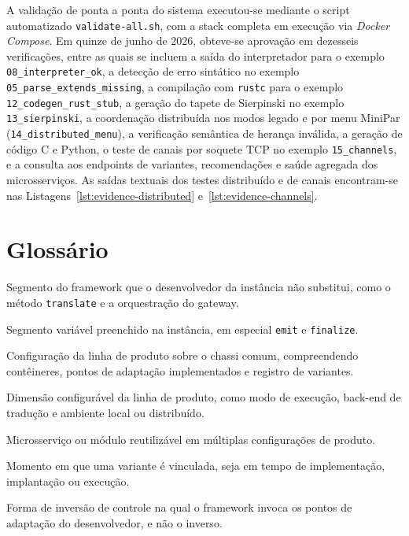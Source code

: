 A validação de ponta a ponta do sistema executou-se mediante o script automatizado \texttt{validate-all.sh}, com a stack completa em execução via \emph{Docker Compose}. Em quinze de junho de 2026, obteve-se aprovação em dezesseis verificações, entre as quais se incluem a saída do interpretador para o exemplo \texttt{08\_interpreter\_ok}, a detecção de erro sintático no exemplo \texttt{05\_parse\_extends\_missing}, a compilação com \texttt{rustc} para o exemplo \texttt{12\_codegen\_rust\_stub}, a geração do tapete de Sierpinski no exemplo \texttt{13\_sierpinski}, a coordenação distribuída nos modos legado e por menu MiniPar (\texttt{14\_distributed\_menu}), a verificação semântica de herança inválida, a geração de código C e Python, o teste de canais por soquete TCP no exemplo \texttt{15\_channels}, e a consulta aos endpoints de variantes, recomendações e saúde agregada dos microsserviços. As saídas textuais dos testes distribuído e de canais encontram-se nas Listagens~\ref{lst:evidence-distributed} e~\ref{lst:evidence-channels}.

\section{Glossário}
\label{app:glossary}

\begin{description}[style=nextline]
    \item[Trecho invariante (\emph{frozen-spot})] Segmento do framework que o desenvolvedor da instância não substitui, como o método \texttt{translate} e a orquestração do gateway.
    \item[Ponto de adaptação (\emph{hotspot})] Segmento variável preenchido na instância, em especial \texttt{emit} e \texttt{finalize}.
    \item[Instância de aplicação] Configuração da linha de produto sobre o chassi comum, compreendendo contêineres, pontos de adaptação implementados e registro de variantes.
    \item[Variabilidade] Dimensão configurável da linha de produto, como modo de execução, back-end de tradução e ambiente local ou distribuído.
    \item[\emph{Asset}] Microsserviço ou módulo reutilizável em múltiplas configurações de produto.
    \item[\emph{Binding time}] Momento em que uma variante é vinculada, seja em tempo de implementação, implantação ou execução.
    \item[Princípio de Hollywood] Forma de inversão de controle na qual o framework invoca os pontos de adaptação do desenvolvedor, e não o inverso.
\end{description}

